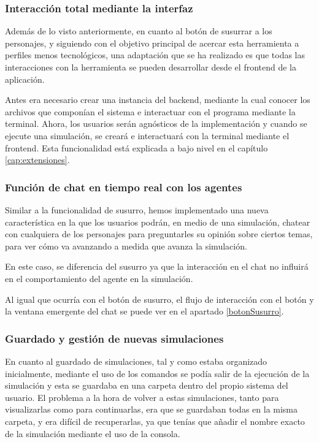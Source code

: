 \subsubsection{Interacción total mediante la interfaz}
Además de lo visto anteriormente, en cuanto al botón de susurrar a los personajes, y siguiendo con el objetivo principal de acercar esta herramienta a perfiles menos tecnológicos, una adaptación que se ha realizado es que todas las interacciones con la herramienta se pueden desarrollar desde el frontend de la aplicación.

Antes era necesario crear una instancia del backend, mediante la cual conocer los archivos que componían el sistema e interactuar con el programa mediante la terminal. Ahora, los usuarios serán agnósticos de la implementación y cuando se ejecute una simulación, se creará e interactuará con la terminal mediante el frontend. Esta funcionalidad está explicada a bajo nivel en el capítulo \ref{cap:extensiones}.

\subsubsection{Función de chat en tiempo real con los agentes}
Similar a la funcionalidad de susurro, hemos implementado una nueva característica en la que los usuarios podrán, en medio de una simulación, chatear con cualquiera de los personajes para preguntarles su opinión sobre ciertos temas, para ver cómo va avanzando a medida que avanza la simulación.

En este caso, se diferencia del susurro ya que la interacción en el chat no influirá en el comportamiento del agente en la simulación.

Al igual que ocurría con el botón de susurro, el flujo de interacción con el botón y la ventana emergente del chat se puede ver en el apartado \ref{botonSusurro}.

\subsubsection{Guardado y gestión de nuevas simulaciones}

En cuanto al guardado de simulaciones, tal y como estaba organizado inicialmente, mediante el uso de los comandos se podía salir de la ejecución de la simulación y esta se guardaba en una carpeta dentro del propio sistema del usuario. El problema a la hora de volver a estas simulaciones, tanto para visualizarlas como para continuarlas, era que se guardaban todas en la misma carpeta, y era difícil de recuperarlas, ya que tenías que añadir el nombre exacto de la simulación mediante el uso de la consola.

